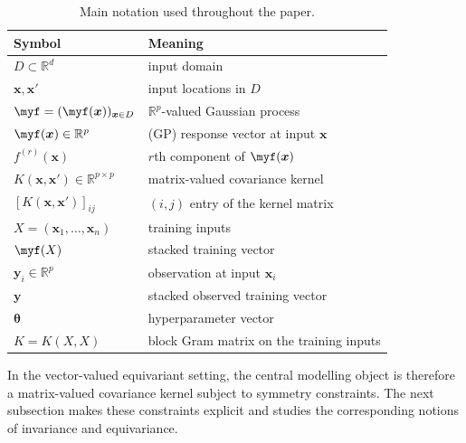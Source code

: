 \documentclass[11pt,a4paper]{article}
\newcommand{\by}{\boldsymbol{y}}
\newcommand{\btheta}{\boldsymbol{\theta}}
\begin{document}
\begin{table}[t]
\centering
\small
\caption{Main notation used throughout the paper.}
\begin{tabular}{@{}ll@{}}
\toprule
Symbol & Meaning \\
\midrule
$D \subset \mathbb{R}^d$ & input domain \\
$\boldsymbol{x},\boldsymbol{x}'$ & input locations in $D$ \\
$\myf=(\myf(\boldsymbol{x}))_{\boldsymbol{x}\in D}$ & $\mathbb{R}^p$-valued Gaussian process \\
$\myf(\boldsymbol{x}) \in \mathbb{R}^p$ &  (GP) response vector at input $\boldsymbol{x}$ \\
$f^{(r)}(\boldsymbol{x})$ & $r$th component of $\myf(\boldsymbol{x})$ \\
$K(\boldsymbol{x},\boldsymbol{x}') \in \mathbb{R}^{p\times p}$ & matrix-valued covariance kernel \\
$[K(\boldsymbol{x},\boldsymbol{x}')]_{ij}$ & $(i,j)$ entry of the kernel matrix \\
$X=(\boldsymbol{x}_1,\dots,\boldsymbol{x}_n)$ & training inputs \\
$\myf(X)$ & stacked training vector \\
$\boldsymbol{y}_i \in \mathbb{R}^p$ & observation at input $\boldsymbol{x}_i$ \\
$\by$ & stacked observed training vector \\
$\btheta$ & hyperparameter vector \\
$K=K(X,X)$ & block Gram matrix on the training inputs\\
\bottomrule
\end{tabular}
\end{table}

In the vector-valued equivariant setting, the central modelling object is therefore a matrix-valued covariance kernel subject to symmetry constraints. The next subsection makes these constraints explicit and studies the corresponding notions of invariance and equivariance.

\end{document}
